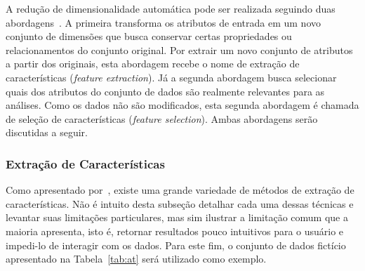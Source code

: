 A redução de dimensionalidade automática pode ser realizada
seguindo duas abordagens~\cite{Pudil1998}. A primeira
transforma os atributos de entrada em um novo conjunto de
dimensões que busca conservar certas propriedades ou
relacionamentos do conjunto original. Por extrair um novo
conjunto de atributos a partir dos originais, esta abordagem
recebe o nome de extração de características (\emph{feature
extraction}). Já a segunda abordagem busca selecionar quais
dos atributos do conjunto de dados são realmente relevantes
para as análises. Como os dados não são
modificados, esta segunda abordagem é chamada de seleção de
características (\emph{feature selection}). Ambas 
abordagens serão discutidas a seguir.

\subsubsection{Extração de Características}

Como apresentado por~\citet{Maaten2009}, existe uma grande
variedade de métodos de extração de características. Não é
intuito desta subseção detalhar cada uma dessas técnicas e
levantar suas limitações particulares, mas sim ilustrar a
limitação comum que a maioria apresenta, isto é, retornar
resultados pouco intuitivos para o usuário e impedi-lo de
interagir com os dados. Para este fim, o conjunto de dados
fictício apresentado na Tabela~\ref{tab:at} será utilizado como
exemplo.

